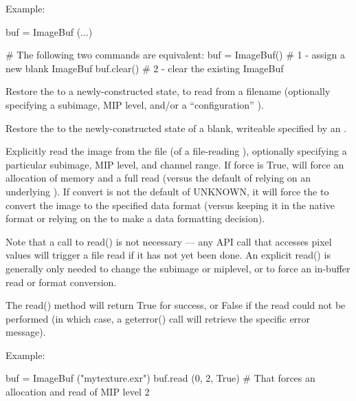 \noindent Example:
\begin{code}
    buf = ImageBuf (...)

    # The following two commands are equivalent:
    buf = ImageBuf()     # 1 - assign a new blank ImageBuf
    buf.clear()          # 2 - clear the existing ImageBuf
\end{code}
\apiend

Restore the \ImageBuf to a newly-constructed state, to read from
a filename (optionally specifying a subimage, MIP level, and/or 
a ``configuration'' \ImageSpec).
\apiend

Restore the \ImageBuf to the newly-constructed state of a blank, writeable
\ImageBuf specified by an \ImageSpec.
\apiend

Explicitly read the image from the file (of a file-reading \ImageBuf), optionally
specifying a particular subimage, MIP level, and channel range.  If {\cf force} is {\cf True},
will force an allocation of memory and a full read (versus the default of
relying on an underlying \ImageCache).  If {\cf convert} is not
the default of {\cf UNKNOWN}, it will force the \ImageBuf to convert the
image to the specified data format (versus keeping it in the native 
format or relying on the \ImageCache to make a data formatting decision).

Note that a call to {\cf read()} is not necessary --- any \ImageBuf API call
that accesses pixel values will trigger a file read if it has not yet been
done. An explicit {\cf read()} is generally only needed to change the
subimage or miplevel, or to force an in-buffer read or format conversion.

The {\cf read()} method will return {\cf True} for success, or {\cf False}
if the read could not be performed (in which case, a {\cf geterror()} call
will retrieve the specific error message).

\noindent Example:
\begin{code}
    buf = ImageBuf ("mytexture.exr")
    buf.read (0, 2, True)
    # That forces an allocation and read of MIP level 2
\end{code}
\apiend


